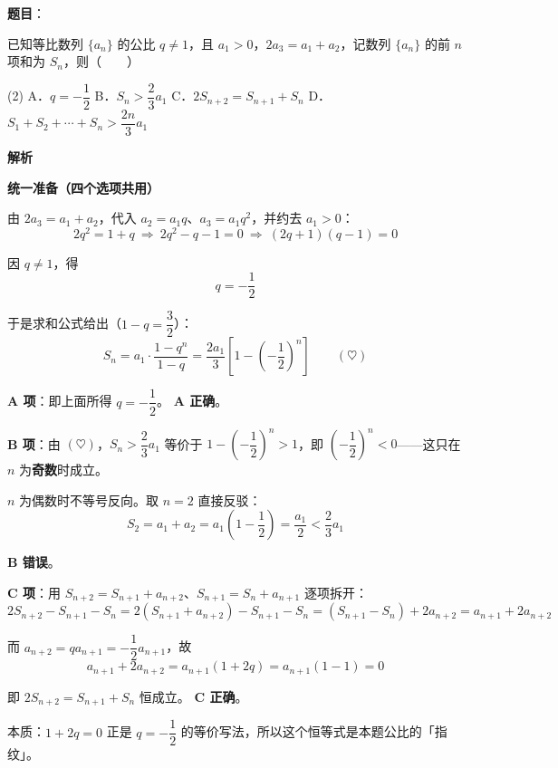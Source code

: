 \begin{answer}

\textbf{题目}：

已知等比数列 $\{a_n\}$ 的公比 $q\ne1$，且 $a_1>0$，$2a_3=a_1+a_2$，记数列 $\{a_n\}$ 的前 $n$ 项和为 $S_n$，则\mbox{（　　）}

\begin{gkopts}(2)
\task A．$q=-\dfrac{1}{2}$
\task B．$S_n>\dfrac{2}{3}a_1$
\task C．$2S_{n+2}=S_{n+1}+S_n$
\task D．$S_1+S_2+\cdots+S_n>\dfrac{2n}{3}a_1$
\end{gkopts}

\textbf{解析}

\textbf{统一准备（四个选项共用）}

由 $2a_3=a_1+a_2$，代入 $a_2=a_1q$、$a_3=a_1q^2$，并约去 $a_1>0$：
\nopagebreak[4]
\[2q^2=1+q\ \Longrightarrow\ 2q^2-q-1=0\ \Longrightarrow\ (2q+1)(q-1)=0\]

因 $q\ne1$，得
\nopagebreak[4]
\[q=-\frac12\]

于是求和公式给出（$1-q=\dfrac32$）：
\nopagebreak[4]
\[S_n=a_1\cdot\frac{1-q^n}{1-q}=\frac{2a_1}{3}\left[1-\left(-\frac12\right)^n\right]\qquad(\heartsuit)\]

\par\medskip

\textbf{A 项}：即上面所得 $q=-\dfrac12$。 \textbf{A 正确}。

\par\medskip

\textbf{B 项}：由 $(\heartsuit)$，$S_n>\dfrac23a_1$ 等价于 $1-\left(-\dfrac12\right)^n>1$，即 $\left(-\dfrac12\right)^n<0$——这只在 $n$ 为\textbf{奇数}时成立。

$n$ 为偶数时不等号反向。取 $n=2$ 直接反驳：
\nopagebreak[4]
\[S_2=a_1+a_2=a_1\left(1-\frac12\right)=\frac{a_1}{2}<\frac23a_1\]

 \textbf{B 错误}。

\par\medskip

\textbf{C 项}：用 $S_{n+2}=S_{n+1}+a_{n+2}$、$S_{n+1}=S_n+a_{n+1}$ 逐项拆开：
\nopagebreak[4]
\[2S_{n+2}-S_{n+1}-S_n=2\left(S_{n+1}+a_{n+2}\right)-S_{n+1}-S_n=\left(S_{n+1}-S_n\right)+2a_{n+2}=a_{n+1}+2a_{n+2}\]

而 $a_{n+2}=qa_{n+1}=-\dfrac12a_{n+1}$，故
\nopagebreak[4]
\[a_{n+1}+2a_{n+2}=a_{n+1}(1+2q)=a_{n+1}\left(1-1\right)=0\]

即 $2S_{n+2}=S_{n+1}+S_n$ 恒成立。 \textbf{C 正确}。

\begin{gktip}
本质：$1+2q=0$ 正是 $q=-\dfrac12$ 的等价写法，所以这个恒等式是本题公比的「指纹」。
\end{gktip}


\end{answer}
